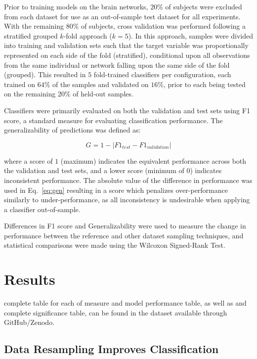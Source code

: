 \documentclass[10pt]{SelfArx} %
\begin{document}
Prior to training models on the brain networks, $20\%$ of subjects were excluded from each dataset for use as an
out-of-sample test dataset for all experiments. With the remaining $80\%$ of subjects, cross validation was performed
following a stratified grouped $k$-fold approach ($k=5$). In this approach, samples were divided into training and
validation sets such that the target variable was proportionally represented on each side of the fold (stratified),
conditional upon all observations from the same individual or network falling upon the same side of the fold (grouped).
This resulted in $5$ fold-trained classifiers per configuration, each trained on $64\%$ of the samples and validated on
$16\%$, prior to each being tested on the remaining $20\%$ of held-out samples.

Classifiers were primarily evaluated on both the validation and test sets using F1 score, a standard measure for
evaluating classification performance. The generalizability of predictions was defined as:

\begin{equation}
G = 1 - \lvert F1_{test} - F1_{validation} \rvert
\label{eq:gen}
\end{equation}

where a score of $1$ (maximum) indicates the equivalent performance across both the validation and test sets, and a
lower score (minimum of $0$) indicates inconsistent performance. The absolute value of the difference in performance
was used in Eq.~\ref{eq:gen} resulting in a score which penalizes over-performance similarly to under-performance, as
all inconsistency is undesirable when applying a classifier out-of-sample.

Differences in F1 score and Generalizability were used to measure the change in performance between the reference and
other dataset sampling techniques, and statistical comparisons were made using the Wilcoxon Signed-Rank Test.


\section*{Results}
complete table for each of measure and model performance table, as well as and complete significance table, can be
found in the dataset available through GitHub/Zenodo.

\subsection*{Data Resampling Improves Classification}
\end{document}
